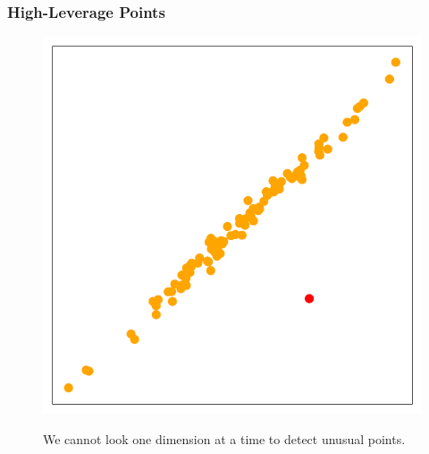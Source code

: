 \documentclass[serif, xcolor={dvipsnames}]{beamer} %
\begin{document}
\begin{frame}
\frametitle{High-Leverage Points}
\vspace{-.18in}
\begin{figure}[htbp]
\hspace{-.2in}
    \begin{minipage}{0.4\textwidth}
        \includegraphics[width=\linewidth]{high_leverage_point}
    \end{minipage}%
    \hspace{.2in}
    \begin{minipage}{0.5\textwidth}
       We cannot look one dimension at a time to detect unusual points.
    \end{minipage}
\end{figure}

\end{frame}
\end{document}
